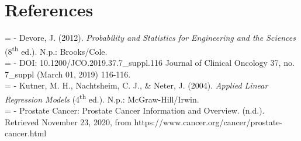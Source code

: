 %
%
%

\section{References}






\hangindent=\parindent
{}
\noindent
- Devore, J. (2012). \textit{Probability and Statistics for Engineering and the Sciences} (8\textsuperscript{th} ed.). N.p.: Brooks/Cole. \\

\hangindent=\parindent
{}
\noindent
- DOI: 10.1200/JCO.2019.37.7\_suppl.116 Journal of Clinical Oncology 37, no. 7\_suppl (March 01, 2019) 116-116. \\

\hangindent=\parindent
{}
\noindent
- Kutner, M. H., Nachtsheim, C. J., \& Neter, J. (2004). \textit{Applied Linear Regression Models} (4\textsuperscript{th} ed.). N.p.: McGraw-Hill/Irwin. \\

\hangindent=\parindent
{}
\noindent
- Prostate Cancer: Prostate Cancer Information and Overview. (n.d.). Retrieved November 23, 2020, from https://www.cancer.org/cancer/prostate-cancer.html \\

